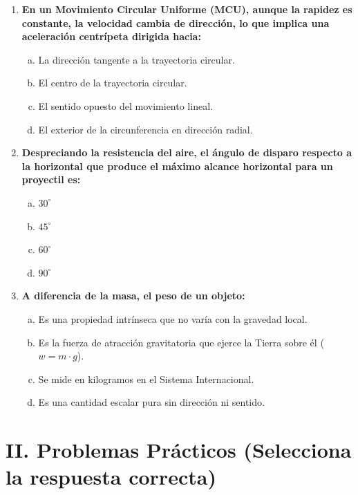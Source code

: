 \documentclass[11pt,a4paper]{article}
\begin{document}
\begin{enumerate}
    \item \textbf{En un Movimiento Circular Uniforme (MCU), aunque la rapidez es constante, la velocidad cambia de dirección, lo que implica una aceleración centrípeta dirigida hacia:}
    \begin{enumerate}[a)]
        \item La dirección tangente a la trayectoria circular.
        \item El centro de la trayectoria circular.
        \item El sentido opuesto del movimiento lineal.
        \item El exterior de la circunferencia en dirección radial.
    \end{enumerate}

    \item \textbf{Despreciando la resistencia del aire, el ángulo de disparo respecto a la horizontal que produce el máximo alcance horizontal para un proyectil es:}
    \begin{enumerate}[a)]
        \item $30^\circ$
        \item $45^\circ$
        \item $60^\circ$
        \item $90^\circ$
    \end{enumerate}

    \item \textbf{A diferencia de la masa, el peso de un objeto:}
    \begin{enumerate}[a)]
        \item Es una propiedad intrínseca que no varía con la gravedad local.
        \item Es la fuerza de atracción gravitatoria que ejerce la Tierra sobre él ($w = m \cdot g$).
        \item Se mide en kilogramos en el Sistema Internacional.
        \item Es una cantidad escalar pura sin dirección ni sentido.
    \end{enumerate}
\end{enumerate}

\hr
\section*{II. Problemas Prácticos (Selecciona la respuesta correcta)}
\end{document}
